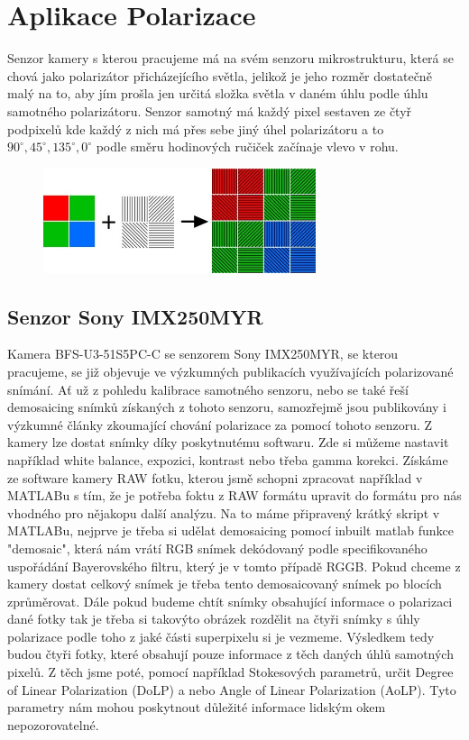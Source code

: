 \documentclass[a4paper]{article}
\numberwithin{equation}{section}
\begin{document}
	\section{Aplikace Polarizace}
	Senzor kamery s kterou pracujeme má na svém senzoru mikrostrukturu, která se chová jako polarizátor přicházejícího světla, jelikož je jeho rozměr dostatečně malý na to, aby jím prošla jen určitá složka světla v daném úhlu podle úhlu samotného polarizátoru. Senzor samotný má každý pixel sestaven ze čtyř podpixelů kde každý z nich má přes sebe jiný úhel polarizátoru a to $90^{\circ}, 45^{\circ}, 135^{\circ}, 0^{\circ}$ podle směru hodinových ručiček začínaje vlevo v rohu.
    \begin{figure}[h]
        \includegraphics[width=8cm]{figures/senzor.jpg}
        \centering
    \end{figure}

    \subsection{Senzor Sony IMX250MYR}
    Kamera BFS-U3-51S5PC-C se senzorem Sony IMX250MYR, se kterou pracujeme, se již objevuje ve výzkumných publikacích využívajících polarizované snímání. Ať už z pohledu kalibrace samotného senzoru, nebo se také řeší demosaicing snímků získaných z tohoto senzoru, samozřejmě jsou publikovány i výzkumné články zkoumající chování polarizace za pomocí tohoto senzoru.\cite{kalibrace,kalibrace2,demosaicing,aplikace} Z kamery lze dostat snímky díky poskytnutému softwaru. Zde si můžeme nastavit například white balance, expozici, kontrast nebo třeba gamma korekci. Získáme ze software kamery RAW fotku, kterou jsmě schopni zpracovat například v MATLABu s tím, že je potřeba foktu z RAW formátu upravit do formátu pro nás vhodného pro nějakopu další analýzu. Na to máme připravený krátký skript v MATLABu, nejprve je třeba si udělat demosaicing pomocí inbuilt matlab funkce "demosaic", která nám vrátí RGB snímek dekódovaný podle specifikovaného uspořádání Bayerovského filtru, který je v tomto případě RGGB. \cite{matlab} Pokud chceme z kamery dostat celkový snímek je třeba tento demosaicovaný snímek po blocích zprůměrovat. Dále pokud budeme chtít snímky obsahující informace o polarizaci dané fotky tak je třeba si takovýto obrázek rozdělit na čtyři snímky s úhly polarizace podle toho z jaké části superpixelu si je vezmeme. Výsledkem tedy budou čtyři fotky, které obsahují pouze informace z těch daných úhlů samotných pixelů. Z těch jsme poté, pomocí například Stokesových parametrů, určit Degree of Linear Polarization (DoLP) a nebo Angle of Linear Polarization (AoLP). Tyto parametry nám mohou poskytnout důležité informace lidským okem  nepozorovatelné. \cite{aolp}
\end{document}
